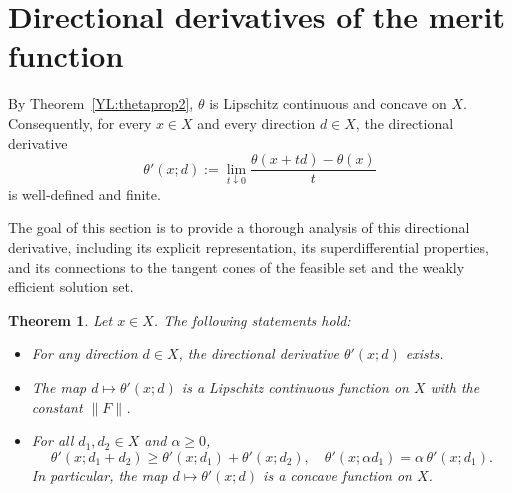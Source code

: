 \documentclass[11pt]{article}
\newtheorem{theorem}{Theorem}[section]
\begin{document}
\section{Directional derivatives of the merit   function  }

By Theorem~\ref{YL:thetaprop2}, \(\theta\) is Lipschitz continuous and concave on \(X\). Consequently, for every \(x\in X\) and every direction \(d\in X\), the   directional derivative  
 \[
  \theta'(x;d):=\lim_{t\downarrow 0}\frac{\theta(x+td)-\theta(x)}{t}
  \]  
  is well‐defined and finite.


The goal of this section is to provide a thorough analysis of this directional derivative, including its explicit representation, its superdifferential properties, and its connections to the tangent cones of the feasible set and the weakly efficient solution set.  

 

\begin{theorem}  \label{JBXZDS} 
Let $x \in X$.	The following statements hold:
	\begin{itemize}
		\item[(i)]  For   any direction $d \in X$, the directional derivative  $	\theta'(x; d)$  exists. 
		\item[(ii)] The map $d \mapsto \theta'( x; d)$ is a Lipschitz continuous   function on $X$ with the   constant $\|F\|$.
			\item[(iii)] For all $d_1, d_2 \in X$ and $\alpha \ge 0$,
			\[
			\theta'(x; d_1+d_2) \ge \theta'( x; d_1) + \theta'( x; d_2), \quad
			\theta'( x; \alpha d_1) = \alpha \,\theta'( x; d_1).
			\]
	In		particular,   the map $d \mapsto \theta'( x; d)$ is a   concave function on $X$.
	\end{itemize}
\end{theorem}
\end{document}
